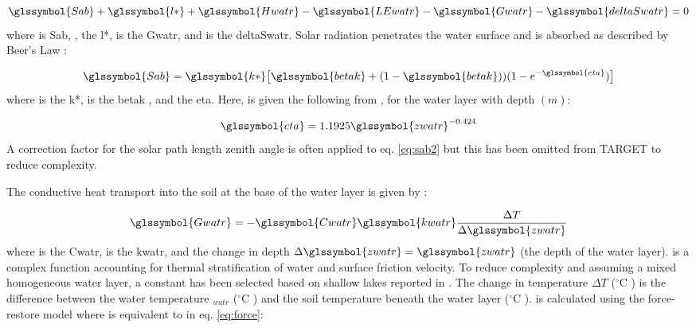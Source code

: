 \documentclass[final,3p,times,authoryear]{elsarticle}
\newcommand{\degreeC}{\ensuremath{^\circ}C }
\begin{document}
\begin{equation} 
\glssymbol{Sab} + \glssymbol{l*} + \glssymbol{Hwatr} - \glssymbol{LEwatr} - \glssymbol{Gwatr} -\glssymbol{deltaSwatr} = 0
\label{eq:sab} \end{equation} where  is \glsdesc{Sab}, , the \glsdesc{l*},  is the \glsdesc{Gwatr}, and  is the \glsdesc{deltaSwatr}. Solar radiation penetrates the water surface and is absorbed as described by Beer's Law \citep{MolinaMartinez2006}:

\begin{equation} 
\glssymbol{Sab} = \glssymbol{k*} \big[ \glssymbol{betak} + (1 - \glssymbol{betak}) )(1-e^{-\glssymbol{eta}})  \big]
\label{eq:sab2} \end{equation} where  is the \glsdesc{k*},  is the \glsdesc{betak} \citep{MolinaMartinez2006}, and  the \glsdesc{eta}. Here,  is given the following from \cite{Subin2012a}, for the water layer with depth  $(m)$:

\begin{equation} 
\glssymbol{eta} = 1.1925 \glssymbol{zwatr}^{-0.424}
\label{eq:eta} \end{equation} A correction factor for the solar path length zenith angle is often applied to eq. \ref{eq:sab2} \citep{MolinaMartinez2006} but this has been omitted from TARGET to reduce complexity. 

The conductive heat transport  into the soil at the base of the water layer is given by \cite{MolinaMartinez2006}:

\begin{equation} 
\glssymbol{Gwatr} = - \glssymbol{Cwatr} \glssymbol{kwatr} \frac{\Delta T}{\Delta \glssymbol{zwatr}}
\label{eq:gwatr} \end{equation} where  is the \glsdesc{Cwatr},  is the \glsdesc{kwatr}, 
and the change in depth $\Delta \glssymbol{zwatr} = \glssymbol{zwatr}$ (the depth of the water layer).  is a complex function accounting for thermal stratification of water and surface friction velocity. To reduce complexity and assuming a mixed homogeneous water layer, a constant  has been selected based on shallow lakes reported in \cite{SalasDeLeon2016}. The change in temperature $\Delta T$ (\degreeC) is the difference between the water temperature $_{watr}$ (\degreeC) and the soil temperature beneath the water layer  (\degreeC).  is calculated using the force-restore model where  is equivalent to  in eq. \ref{eq:force}:
\end{document}
